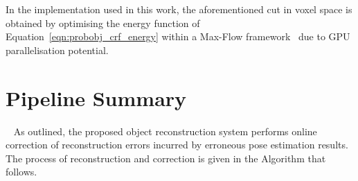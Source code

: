 In the implementation used in this work, the aforementioned cut in voxel space
is obtained by optimising the energy function of Equation~\ref{eqn:probobj_crf_energy} 
within a Max-Flow framework~\cite{Boykov2001} due to GPU parallelisation potential. %

\section{Pipeline Summary}
~\label{sec:probobj_pipeline_summary}
As outlined, the proposed object reconstruction system performs online correction of 
reconstruction errors incurred by erroneous pose estimation results. The process of 
reconstruction and correction is given in the Algorithm that follows.

